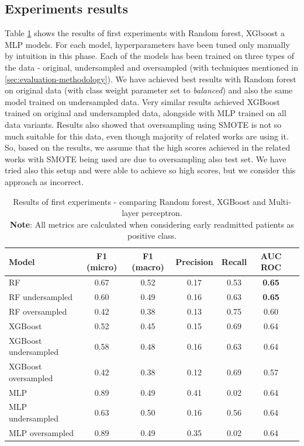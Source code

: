 \documentclass[runningheads]{llncs}
\begin{document}
\subsection{Experiments results}
Table \ref{table:preliminary-results} shows the results of first experiments with Random forest, XGboost a MLP models. For each model, hyperparameters have been tuned only manually by intuition in this phase. Each of the models has been trained on three types of the data - original, undersampled and oversampled (with techniques mentioned in \ref{sec:evaluation-methodology}). We have achieved best results with Random forest on original data (with class weight parameter set to \textit{balanced}) and also the same model trained on undersampled data. Very similar results achieved XGBoost trained on original and undersampled data, alongside with MLP trained on all data variants. Results also showed that oversampling using SMOTE is not so much suitable for this data, even though majority of related works are using it. So, based on the results, we assume that the high scores achieved in the related works with SMOTE being used are due to oversampling also test set. We have tried also this setup and were able to achieve so high scores, but we consider this approach as incorrect.

\begin{table}
    \centering
    \caption{Results of first experiments - comparing Random forest, XGBoost and Multi-layer perceptron.\\\textbf{Note}: All metrics are calculated when considering early readmitted patients as positive class.}
    \begin{tabular}{ |l|c|c|c|c|c|c| } 
    \hline
    \textbf{Model} & \textbf{F1 (micro)} & \textbf{F1 (macro)} & \textbf{Precision} &  \textbf{Recall} &  \textbf{AUC ROC} \\
    \hline
    RF &   0.67    &   0.52    &   0.17    &   0.53   &   \textbf{0.65}\\
    RF undersampled &   0.60    &   0.49    &   0.16    &   0.63   &   \textbf{0.65}   \\
    RF oversampled &   0.42    &   0.38    &   0.13    &   0.75   &   0.60   \\
    \hline
    XGBoost &   0.52    &   0.45    &   0.15    &   0.69   &   0.64   \\
    XGBoost undersampled &   0.58    &   0.48    &   0.16    &   0.63   &   0.64   \\
    XGBoost oversampled &   0.42    &   0.38    &   0.12    &   0.69   &   0.57   \\
    \hline
    MLP &   0.89    &   0.49    &   0.41    &   0.02   &   0.64   \\
    MLP undersampled &   0.63    &   0.50    &   0.16    &   0.56   &   0.64   \\
    MLP oversampled &   0.89    &   0.49    &   0.35    &   0.02   &   0.64   \\
    \hline
    \end{tabular}
    \label{table:preliminary-results}
\end{table}
\end{document}
